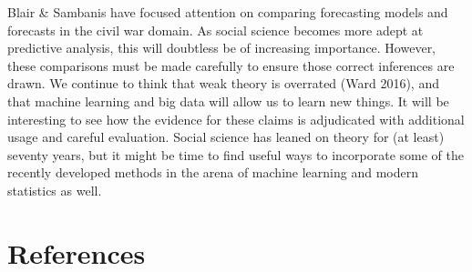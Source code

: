 \documentclass[
]{article}
\begin{document}
Blair \& Sambanis have focused attention on comparing forecasting models and forecasts in the civil war domain. As social science becomes more adept at predictive analysis, this will doubtless be of increasing importance. However, these comparisons must be made carefully to ensure those correct inferences are drawn. We continue to think that weak theory is overrated (Ward 2016), and that machine learning and big data will allow us to learn new things. It will be interesting to see how the evidence for these claims is adjudicated with additional usage and careful evaluation. Social science has leaned on theory for (at least) seventy years, but it might be time to find useful ways to incorporate some of the recently developed methods in the arena of machine learning and modern statistics as well.

\newpage

\hypertarget{references}{%
\section{References}\label{references}}
\end{document}

